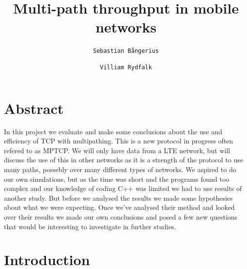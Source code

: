 \documentclass[11pt,twocolumn]{article}
\author{
  \texttt{Sebastian Bångerius}
  \and
  \texttt{Villiam Rydfalk}
}
\begin{document}

\title{Multi-path throughput in mobile networks}
\maketitle

\cleardoublepage


\section{Abstract}

In this project we evaluate and make some conclusions about the use and efficiency of TCP with multipathing. This is a new protocol in progress often refered to as MPTCP. We will only have data from a LTE network, but will discuss the use of this in other networks as it is a strength of the protocol to use many paths, possebly over many different types of networks. We aspired to do our own simulations, but as the time was short and the programs found too complex and our knowledge of coding C++ was limited we had to use results of another study. \cite{MPTCP-LTE} But before we analysed the results we made some hypothesies about what we were expecting. Once we've analysed their method and looked over their results we made our own conclusions and posed a few new questions that would be interesting to investigate in further studies.



\section{Introduction}
\end{document}
